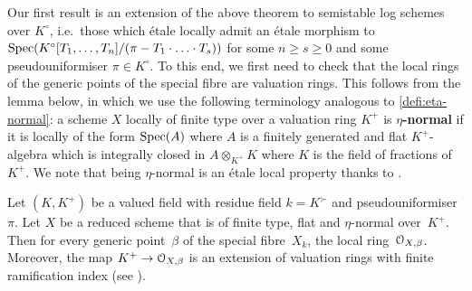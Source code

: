Our first result is an extension of the above theorem to semistable log schemes over $K^\circ$, i.e.\ those which \'etale locally admit an \'etale morphism to $\operatorname{Spec}(K^\circ[T_1,\dots,T_n]/(\pi- T_1\cdot\ldots\cdot T_s))$ for some $n \geq s \geq 0$ and some pseudouniformiser $\pi\in K^\circ$. To this end, we first need to check that the local rings of the generic points of the special fibre are valuation rings. This follows from the lemma below, in which we use the following terminology analogous to \cref{defi:eta-normal}: a scheme $X$ locally of finite type over a valuation ring $K^+$ is {\bf $\eta$-normal} if it is locally of the form $\operatorname{Spec}(A)$ where $A$ is a finitely generated and flat $K^+$-algebra which is integrally closed in $A\otimes_{K^+} K$ where $K$ is the field of fractions of $K^+$. We note that being $\eta$-normal is an \'etale local property thanks to .


\begin{lem} \label{lem:local-ring-val-ring}
    Let $(K,K^+)$ be a valued field with residue field $k = K^\succ$ and pseudouniformiser~$\pi$.
    Let $X$ be a reduced scheme that is of finite type, flat and $\eta$-normal over~$K^+$.
    Then for every generic point~$\beta$ of the special fibre~$X_k$, the local ring~${\mathcal O}_{X,\beta}$.
    Moreover, the map $K^+\to {\mathcal O}_{X,\beta}$ is an extension of valuation rings with finite ramification index (see ). 
\end{lem}


